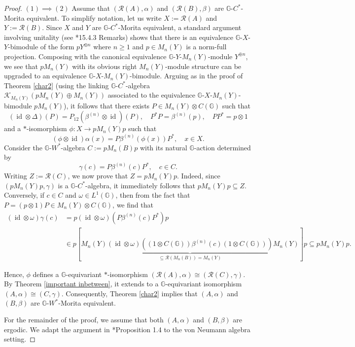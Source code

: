 \documentclass[reqno]{amsart}
\numberwithin{equation}{section}
\DeclareMathOperator{\id}{\mathrm{id}}
\newcommand{\G}{\mathbb{G}}
\begin{document}
\begin{proof} $(1)\implies (2)$ Assume that $(\mathcal{R}(A), \alpha)$ and $(\mathcal{R}(B), \beta)$ are $\G$-$C^*$-Morita equivalent. To simplify notation, let us write $X:= \mathcal{R}(A)$ and $Y:= \mathcal{R}(B)$.
Since $X$ and $Y$ are $\G$-$C^*$-Morita equivalent, a standard argument involving unitality (see \cite{WO93}*{15.4.3 Remarks}) shows that there is an equivalence $\G$-$X$-$Y$-bimodule of the form $pY^{\oplus n}$ where $n \ge 1$ and $p\in M_n(Y)$ is a norm-full projection. Composing with the canonical equivalence $\G$-$Y$-$M_n(Y)$-module $Y^{\oplus n}$, we see that $p M_n(Y)$ with its obvious right $M_n(Y)$-module structure can be upgraded to an equivalence $\G$-$X$-$M_n(Y)$-bimodule. Arguing as in the proof of Theorem \ref{char2} (using the linking $\G$-$C^*$-algebra $\mathcal{K}_{M_n(Y)}(pM_n(Y)\oplus M_n(Y))$ associated to the equivalence $\G$-$X$-$M_n(Y)$-bimodule $p M_n(Y)$), it follows that there exists $P \in M_n(Y)\otimes C(\G)$ such that
$$(\id \otimes \Delta)(P) = P_{12} (\beta^{(n)}\otimes \id)(P), \quad P^*P= \beta^{(n)}(p), \quad PP^* = p\otimes 1$$
and a $*$-isomorphism
$\phi: X \to p M_n(Y) p$
such that 
$$(\phi\otimes \id)\alpha(x)= P \beta^{(n)}(\phi(x))P^*, \quad x \in X.$$
Consider the $\G$-$W^*$-algebra $C:= pM_n(B)p$ with its natural $\G$-action determined by
$$\gamma(c)= P \beta^{(n)}(c) P^*, \quad c \in C.$$
Writing $Z:= \mathcal{R}(C)$, we now prove that $Z= p M_n(Y) p$. Indeed, since $(p M_n(Y)p, \gamma)$ is a $\G$-$C^*$-algebra, it immediately follows that $p M_n(Y)p \subseteq Z$. Conversely, if $c\in C$ and $\omega \in L^1(\G)$, then from the fact that $P = (p\otimes 1)P \in M_n(Y)\otimes C(\G)$, we find that
\begin{align*}
    (\id \otimes \omega)\gamma(c)&= p(\id \otimes \omega)(P \beta^{(n)}(c) P^*)p\\
    &\in p[M_n(Y)\underbrace{(\id \otimes \omega)((1\otimes C(\G))\beta^{(n)}(c)(1\otimes C(\G)))}_{\subseteq \mathcal{R}(M_n(B)) = M_n(Y)} M_n(Y)]p\subseteq p M_n(Y)p.
\end{align*}

Hence, $\phi$ defines a $\G$-equivariant $*$-isomorphism
$(\mathcal{R}(A), \alpha)\cong (\mathcal{R}(C), \gamma).$
By Theorem \ref{important inbetween}, it extends to a $\G$-equivariant isomorphism $(A, \alpha)\cong (C, \gamma)$. Consequently, Theorem \ref{char2} implies that $(A, \alpha)$ and $ (B, \beta)$ are $\G$-$W^*$-Morita equivalent.

For the remainder of the proof, we assume that both $(A, \alpha)$ and $(B, \beta)$ are ergodic. We adapt the argument in \cite{DC12}*{Proposition 1.4} to the von Neumann algebra setting. 


\end{proof}
\end{document}
